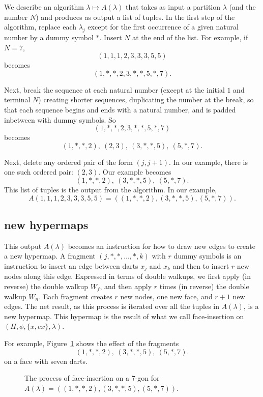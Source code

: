 We describe an algorithm $\lambda\mapsto A(\lambda)$ that takes
as input a partition $\lambda$ (and the number $N$)
and produces as output a list of
tuples.
In the first step of the algorithm,
replace each $\lambda_j$ except for the
first occurrence of a given natural number by a dummy symbol $*$.
Insert $N$ at the end of the list. For example, if $N=7$,
    $$(1,1,1,2,3,3,3,5,5)$$ becomes
    $$(1,*,*,2,3,*,*,5,*,7).$$

Next, break the sequence at each natural number (except at the initial $1$
and terminal $N$)
creating shorter sequences, duplicating the number at the break,
so that each sequence begins and ends with a natural number,
and is padded inbetween with dummy symbols. So
    $$(1,*,*,2,3,*,*,5,*,7)$$ becomes
$$(1,*,*,2),\ (2,3),\ (3,*,*,5),\ (5,*,7).$$

Next,
delete any ordered pair of the form $(j,j+1)$. In our example, there
is one such ordered pair: $(2,3)$.  Our example becomes
  $$
  (1,*,*,2),\  (3,*,*,5),\ (5,*,7).
  $$
This list of tuples is the output from the algorithm.
In our example,
  $$A(1,1,1,2,3,3,3,5,5) = ((1,*,*,2),(3,*,*,5),(5,*,7)).$$



\subsection{new hypermaps}

This output $A(\lambda)$
becomes an instruction for how to draw new edges to create a
new hypermap. A fragment $(j,*,*,\ldots,*,k)$ with $r$ dummy symbols
is an instruction to insert an edge between darts $x_j$ and $x_k$
and then to insert $r$ new nodes along this edge.
Expressed in terms of double walkups, we first apply (in
reverse) the double walkup $W_f$, and then apply $r$ times (in
reverse) the double walkup $W_n$.  Each fragment creates $r$ new
nodes, one new face, and $r+1$ new edges.  The net result, as this process is
iterated over all the tuples in $A(\lambda)$, is a new hypermap. 
This hypermap is the result of what we call face-insertion
on $(H,\phi,\{x,e x\},\lambda)$.

For example, Figure~\ref{fig:7darts} shows the effect of the fragments
$$(1,*,*,2),\ (3,*,*,5),\ (5,*,7).
  $$ on a face with seven darts.


\begin{figure}[htb]
  \centering
  \caption{The process of face-insertion on a $7$-gon for
   $A(\lambda) = ((1,*,*,2),(3,*,*,5),(5,*,7))$.}
  \label{fig:7darts}
\end{figure}

